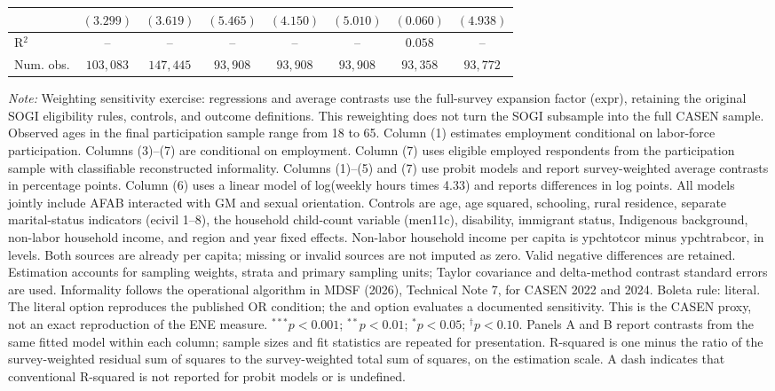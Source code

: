 \begin{table}[htpb!]
{\begin{tabular}{l c c c c c c c}
 & $(3.299)$ & $(3.619)$ & $(5.465)$ & $(4.150)$ & $(5.010)$ & $(0.060)$ & $(4.938)$ \\
\hline
R$^2$ & -- & -- & -- & -- & -- & $0.058$ & -- \\
Num. obs. & $103,083$ & $147,445$ & $93,908$ & $93,908$ & $93,908$ & $93,358$ & $93,772$ \\
\hline
\end{tabular}%
}
\par\vspace{1ex}
\begin{minipage}{\textwidth}\footnotesize\raggedright
\textit{Note:} Weighting sensitivity exercise: regressions and average contrasts use the full-survey expansion factor (expr), retaining the original SOGI eligibility rules, controls, and outcome definitions. This reweighting does not turn the SOGI subsample into the full CASEN sample. Observed ages in the final participation sample range from 18 to 65. Column (1) estimates employment conditional on labor-force participation. Columns (3)--(7) are conditional on employment.  Column (7) uses eligible employed respondents from the participation sample with classifiable reconstructed informality. Columns (1)--(5) and (7) use probit models and report survey-weighted average contrasts in percentage points. Column (6) uses a linear model of log(weekly hours times 4.33) and reports differences in log points. All models jointly include AFAB interacted with GM and sexual orientation. Controls are age, age squared, schooling, rural residence, separate marital-status indicators (ecivil 1--8), the household child-count variable (men11c), disability, immigrant status, Indigenous background, non-labor household income, and region and year fixed effects. Non-labor household income per capita is ypchtotcor minus ypchtrabcor, in levels. Both sources are already per capita; missing or invalid sources are not imputed as zero. Valid negative differences are retained. Estimation accounts for sampling weights, strata and primary sampling units; Taylor covariance and delta-method contrast standard errors are used. Informality follows the operational algorithm in MDSF (2026), Technical Note 7, for CASEN 2022 and 2024. Boleta rule: literal. The literal option reproduces the published OR condition; the and option evaluates a documented sensitivity. This is the CASEN proxy, not an exact reproduction of the ENE measure. $^{***}p<0.001$; $^{**}p<0.01$; $^{*}p<0.05$; $^{\dagger}p<0.10$. Panels A and B report contrasts from the same fitted model within each column; sample sizes and fit statistics are repeated for presentation. R-squared is one minus the ratio of the survey-weighted residual sum of squares to the survey-weighted total sum of squares, on the estimation scale. A dash indicates that conventional R-squared is not reported for probit models or is undefined.
\end{minipage}
\end{table}
